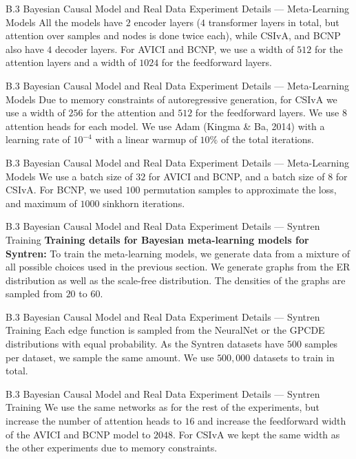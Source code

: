\documentclass[aspectratio=169,10pt]{beamer}
\begin{document}
\begin{frame}{B.3 Bayesian Causal Model and Real Data Experiment Details --- Meta-Learning Models}
\small
All the models have $2$ encoder layers ($4$ transformer layers in total, but attention over samples and nodes is done twice each), while CSIvA, and BCNP also have $4$ decoder layers. For AVICI and BCNP, we use a width of $512$ for the attention layers and a width of $1024$ for the feedforward layers.
\end{frame}

\begin{frame}{B.3 Bayesian Causal Model and Real Data Experiment Details --- Meta-Learning Models}
\small
Due to memory constraints of autoregressive generation, for CSIvA we use a width of $256$ for the attention and $512$ for the feedforward layers. We use $8$ attention heads for each model. We use Adam (Kingma \& Ba, 2014) with a learning rate of $10^{-4}$ with a linear warmup of $10\%$ of the total iterations.
\end{frame}

\begin{frame}{B.3 Bayesian Causal Model and Real Data Experiment Details --- Meta-Learning Models}
We use a batch size of $32$ for AVICI and BCNP, and a batch size of $8$ for CSIvA. For BCNP, we used $100$ permutation samples to approximate the loss, and maximum of $1000$ sinkhorn iterations.
\end{frame}

\begin{frame}{B.3 Bayesian Causal Model and Real Data Experiment Details --- Syntren Training}
\small
\textbf{Training details for Bayesian meta-learning models for Syntren:}\quad
To train the meta-learning models, we generate data from a mixture of all possible choices used in the previous section. We generate graphs from the ER distribution as well as the scale-free distribution. The densities of the graphs are sampled from $20$ to $60$.
\end{frame}

\begin{frame}{B.3 Bayesian Causal Model and Real Data Experiment Details --- Syntren Training}
\small
Each edge function is sampled from the NeuralNet or the GPCDE distributions with equal probability. As the Syntren datasets have $500$ samples per dataset, we sample the same amount. We use $500,000$ datasets to train in total.
\end{frame}

\begin{frame}{B.3 Bayesian Causal Model and Real Data Experiment Details --- Syntren Training}
We use the same networks as for the rest of the experiments, but increase the number of attention heads to $16$ and increase the feedforward width of the AVICI and BCNP model to $2048$. For CSIvA we kept the same width as the other experiments due to memory constraints.
\end{frame}
\end{document}
